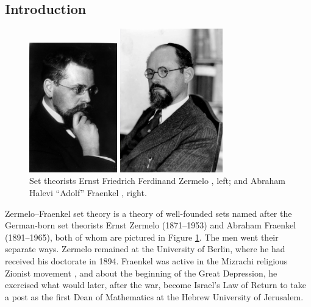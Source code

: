 \documentclass[letterpaper]{article}
\begin{document}
\subsection{Introduction}
\begin{figure}
	\centering
	\begin{minipage}{2in}
		\centering
		\includegraphics[width=1.5in]{images/PortraitZurich-sw-nb-300.jpg}
	\end{minipage}
	\begin{minipage}{2.25in}
		\centering
		\includegraphics[width=1.75in]{images/Adolf_Abraham_Halevi_Fraenkel.jpg}
	\end{minipage}
	\caption[Ernst Zermelo and Abraham Fraenkel]{Set theorists Ernst Friedrich Ferdinand Zermelo \cite{mildenberger2014}, left; and Abraham Halevi ``Adolf'' Fraenkel \cite{fraenkel-photo}, right.}\label{zfphoto}
\end{figure}
Zermelo--Fraenkel set theory is a theory of well-founded sets named after the German-born set theorists Ernst Zermelo (1871--1953) and Abraham Fraenkel (1891--1965), both of whom are pictured in Figure \ref{zfphoto}. The men went their separate ways.  Zermelo remained at the University of Berlin, where he had received his doctorate in 1894.  Fraenkel was active in the Mizrachi religious Zionist movement \cite{cohen-mansfield2016}, and about the beginning of the Great Depression, he exercised what would later, after the war, become Israel's Law of Return to take a post as the first Dean of Mathematics at the Hebrew University of Jerusalem.
\end{document}
